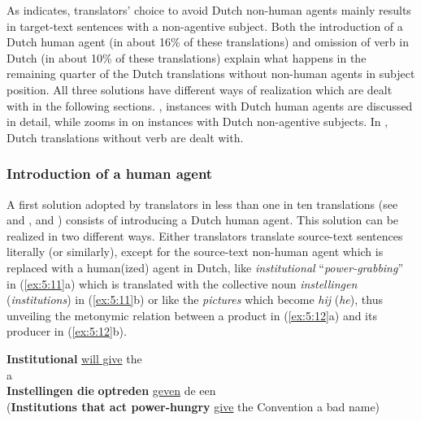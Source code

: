 \documentclass[output=paper]{LSP/langsci}
\begin{document}
As  indicates, translators’ choice to avoid Dutch non-human agents mainly results in target-text sentences with a non-agentive subject. Both the introduction of a Dutch human agent (in about 16\% of these translations) and omission of verb in Dutch (in about 10\% of these translations) explain what happens in the remaining quarter of the Dutch translations without non-human agents in subject position. All three solutions have different ways of realization which are dealt with in the following sections. , instances with Dutch human agents are discussed in detail, while  zooms in on instances with Dutch non-agentive subjects. In , Dutch translations without verb are dealt with.  

\subsubsection{Introduction of a human agent} \label{sec:5:6:2:1}

A first solution adopted by translators in less than one in ten translations (see  and ,  and ) consists of introducing a Dutch human agent. This solution can be realized in two different ways. Either translators translate source-text sentences literally (or similarly), except for the source-text non-human agent which is replaced with a human(ized) agent in Dutch, like \textit{institutional} “\textit{power-grabbing}” in (\ref{ex:5:11}a) which is translated with the collective noun \textit{instellingen} (\textit{institutions}) in (\ref{ex:5:11}b) or like the \textit{pictures} which become \textit{hij} (\textit{he}), thus unveiling the metonymic relation between a product in (\ref{ex:5:12}a) and its producer in (\ref{ex:5:12}b).  

\ea \label{ex:5:11}
\ea \textbf{Institutional}  \ul{will give} the \\ a \\[1em]
\ex \textbf{Instellingen die}  \textbf{optreden} \ul{geven} de  een \\
(\textbf{Institutions that act power-hungry} \ul{give} the Convention a bad name)
\z
\z

\end{document}
